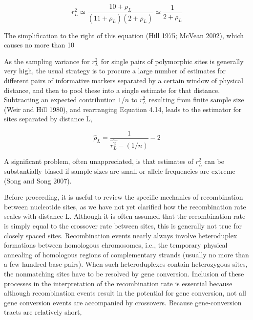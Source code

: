 \documentclass{article}
\begin{document}
\begin{equation}
r_{L}^{2}\simeq\frac{10+\rho_{L}}{(11+\rho_{L})(2+\rho_{L})}\simeq\frac{1}{2+\rho_{L}}
\tag{4.14}
\label{eq:4_14}
\end{equation}

The simplification to the right of this equation (Hill 1975; McVean 2002), which causes no more than 10%

As the sampling variance for  $ r_{L}^{2} $ for single pairs of polymorphic sites is generally very high, the usual strategy is to procure a large number of estimates for different pairs of informative markers separated by a certain window of physical distance, and then to pool these into a single estimate for that distance. Subtracting an expected contribution  $ 1/n $ to  $ r_{L}^{2} $ resulting from finite sample size (Weir and Hill 1980), and rearranging Equation 4.14, leads to the estimator for sites separated by distance L,

\begin{equation}
\widehat{\rho}_{L}=\frac{1}{\widehat{r_{L}^{2}}-\left(1/n\right)}-2
\tag{4.15}
\label{eq:4_15}
\end{equation}

A significant problem, often unappreciated, is that estimates of  $ r_{L}^{2} $ can be substantially biased if sample sizes are small or allele frequencies are extreme (Song and Song 2007).

Before proceeding, it is useful to review the specific mechanics of recombination between nucleotide sites, as we have not yet clarified how the recombination rate scales with distance L. Although it is often assumed that the recombination rate is simply equal to the crossover rate between sites, this is generally not true for closely spaced sites. Recombination events nearly always involve heteroduplex formations between homologous chromosomes, i.e., the temporary physical annealing of homologous regions of complementary strands (usually no more than a few hundred base pairs). When such heteroduplexes contain heterozygous sites, the nonmatching sites have to be resolved by gene conversion. Inclusion of these processes in the interpretation of the recombination rate is essential because although recombination events result in the potential for gene conversion, not all gene conversion events are accompanied by crossovers. Because gene-conversion tracts are relatively short,
\end{document}

